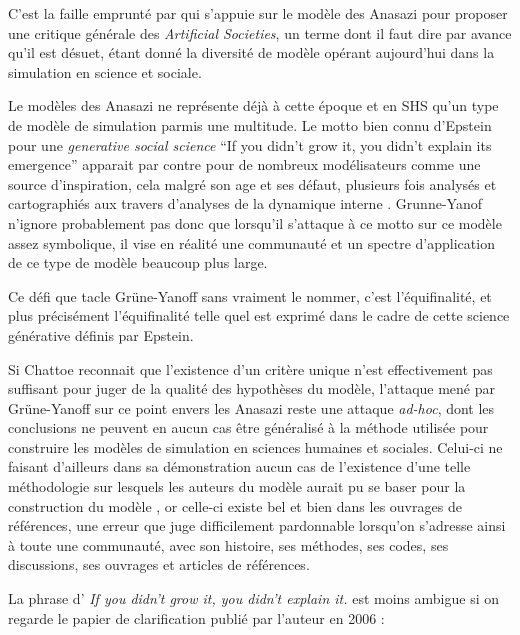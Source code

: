 C'est la faille emprunté par \textcite{Yanoff2008} qui s'appuie sur le modèle des Anasazi pour proposer une critique générale des \textit{Artificial Societies}, un terme dont il faut dire par avance qu'il est désuet, étant donné la diversité de modèle opérant aujourd'hui dans la simulation en science et sociale.

Le modèles des Anasazi \autocites{Dean2000, Epstein2002} ne représente déjà à cette époque et en SHS qu'un type de modèle de simulation parmis une multitude. Le motto bien connu d'Epstein pour une \textit{generative social science} \foreignquote{english}{If you didn't grow it, you didn't explain its emergence} \autocite{Epstein2006} apparait par contre pour de nombreux modélisateurs comme une source d'inspiration, cela malgré son age et ses défaut, plusieurs fois analysés et cartographiés aux travers d'analyses de la dynamique interne \autocites{Janssen2009, Stonedahl2010, Schmitt2013}[151]{Schmitt2014}. Grunne-Yanof n'ignore probablement pas donc que lorsqu'il s'attaque à ce motto sur ce modèle assez symbolique, il vise en réalité une communauté et un spectre d'application de ce type de modèle beaucoup plus large. 

Ce défi que tacle Grüne-Yanoff sans vraiment le nommer, c'est l'équifinalité,  et plus précisément l'équifinalité telle quel est exprimé dans le cadre de cette science générative définis par Epstein.

Si Chattoe reconnait que l'existence d'un critère unique n'est effectivement pas suffisant pour juger de la qualité des hypothèses du modèle, l'attaque mené par Grüne-Yanoff sur ce point envers les Anasazi reste une attaque \textit{ad-hoc}, dont les conclusions ne peuvent en aucun cas être généralisé à la méthode utilisée pour construire les modèles de simulation en sciences humaines et sociales. Celui-ci ne faisant d'ailleurs dans sa démonstration aucun cas de l'existence d'une telle méthodologie sur lesquels les auteurs du modèle aurait pu se baser pour la construction du modèle , or celle-ci existe bel et bien dans les ouvrages de références, une erreur que \textcite{Chattoe2011} juge difficilement pardonnable lorsqu'on s'adresse ainsi à toute une communauté, avec son histoire, ses méthodes, ses codes, ses discussions, ses ouvrages et articles de références. 

La phrase d'\textcite{Epstein1999} \textit{If you didn’t grow it, you didn’t explain it.} est moins ambigue si on regarde le papier de clarification publié par l'auteur en 2006 : 

